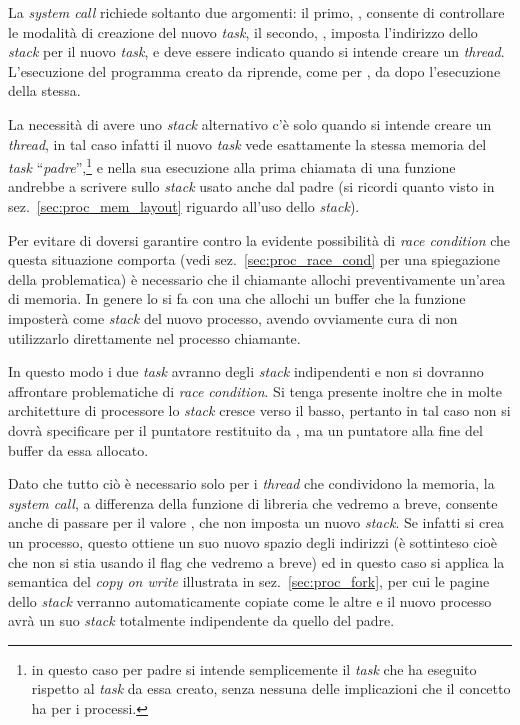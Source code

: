 La \textit{system call} richiede soltanto due argomenti: il
primo, , consente di controllare le modalità di creazione del
nuovo \textit{task}, il secondo, , imposta l'indirizzo
dello \textit{stack} per il nuovo \textit{task}, e deve essere indicato quando
si intende creare un \textit{thread}. L'esecuzione del programma creato da
 riprende, come per , da dopo l'esecuzione della
stessa.

La necessità di avere uno \textit{stack} alternativo c'è solo quando si
intende creare un \textit{thread}, in tal caso infatti il nuovo \textit{task}
vede esattamente la stessa memoria del \textit{task}
``\textsl{padre}'',\footnote{in questo caso per padre si intende semplicemente
  il \textit{task} che ha eseguito  rispetto al \textit{task}
  da essa creato, senza nessuna delle implicazioni che il concetto ha per i
  processi.} e nella sua esecuzione alla prima chiamata di una funzione
andrebbe a scrivere sullo \textit{stack} usato anche dal padre (si ricordi
quanto visto in sez.~\ref{sec:proc_mem_layout} riguardo all'uso dello
\textit{stack}).

Per evitare di doversi garantire contro la evidente possibilità di
\textit{race condition} che questa situazione comporta (vedi
sez.~\ref{sec:proc_race_cond} per una spiegazione della problematica) è
necessario che il chiamante allochi preventivamente un'area di memoria.  In
genere lo si fa con una  che allochi un buffer che la funzione
imposterà come \textit{stack} del nuovo processo, avendo ovviamente cura di
non utilizzarlo direttamente nel processo chiamante.

In questo modo i due \textit{task} avranno degli \textit{stack} indipendenti e
non si dovranno affrontare problematiche di \textit{race condition}.  Si tenga
presente inoltre che in molte architetture di processore lo \textit{stack}
cresce verso il basso, pertanto in tal caso non si dovrà specificare
per  il puntatore restituito da , ma un
puntatore alla fine del buffer da essa allocato.

Dato che tutto ciò è necessario solo per i \textit{thread} che condividono la
memoria, la \textit{system call}, a differenza della funzione di libreria che
vedremo a breve, consente anche di passare per  il valore
, che non imposta un nuovo \textit{stack}. Se infatti si crea un
processo, questo ottiene un suo nuovo spazio degli indirizzi (è sottinteso
cioè che non si stia usando il flag  che vedremo a breve) ed
in questo caso si applica la semantica del \textit{copy on write} illustrata
in sez.~\ref{sec:proc_fork}, per cui le pagine dello \textit{stack} verranno
automaticamente copiate come le altre e il nuovo processo avrà un suo
\textit{stack} totalmente indipendente da quello del padre.


